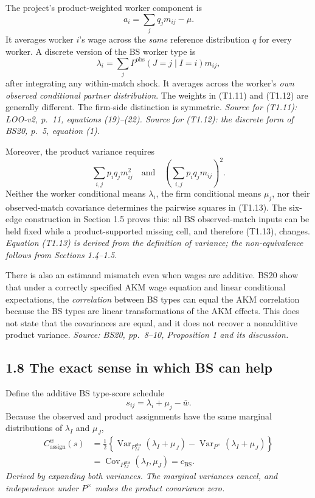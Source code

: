 \documentclass[11pt]{article}
\begin{document}
The project's product-weighted worker component is
\[
a_i
=\sum_jq_jm_{ij}-\mu.
\tag{T1.11}
\]
It averages worker \(i\)'s wage across the \emph{same} reference distribution
\(q\) for every worker.  A discrete version of the BS worker type is
\[
\lambda_i
=\sum_jP^{\mathrm{obs}}(J=j\mid I=i)m_{ij},
\tag{T1.12}
\]
after integrating any within-match shock.  It averages across the worker's
\emph{own observed conditional partner distribution}.  The weights in
(T1.11) and (T1.12) are generally different.  The firm-side distinction is
symmetric.
\textit{Source for (T1.11): LOO-v2, p.\ 11, equations (19)--(22).
Source for (T1.12): the discrete form of BS20, p.\ 5, equation (1).}

Moreover, the product variance requires
\[
\sum_{i,j}p_iq_jm_{ij}^2
\quad\text{and}\quad
\left(\sum_{i,j}p_iq_jm_{ij}\right)^2.
\tag{T1.13}
\]
Neither the worker conditional means \(\lambda_i\), the firm conditional means
\(\mu_j\), nor their observed-match covariance determines the pairwise
squares in (T1.13).  The six-edge construction in Section 1.5 proves this:
all BS observed-match inputs can be held fixed while a product-supported
missing cell, and therefore (T1.13), changes.
\textit{Equation (T1.13) is derived from the definition of variance; the
non-equivalence follows from Sections 1.4--1.5.}

There is also an estimand mismatch even when wages are additive.  BS20 show
that under a correctly specified AKM wage equation and linear conditional
expectations, the \emph{correlation} between BS types can equal the AKM
correlation because the BS types are linear transformations of the AKM
effects.  This does not state that the covariances are equal, and it does not
recover a nonadditive product variance.
\textit{Source: BS20, pp.\ 8--10, Proposition 1 and its discussion.}

\subsection{1.8 The exact sense in which BS can help}

Define the additive BS type-score schedule
\[
s_{ij}=\lambda_i+\mu_j-\bar w.
\tag{T1.14}
\]
Because the observed and product assignments have the same marginal
distributions of \(\lambda_I\) and \(\mu_J\),
\[
\begin{aligned}
C^w_{\mathrm{assign}}(s)
&=\frac12\left\{
\operatorname{Var}_{P^{\mathrm{obs}}_{IJ}}(\lambda_I+\mu_J)
-\operatorname{Var}_{P^\times}(\lambda_I+\mu_J)
\right\}\\
&=\operatorname{Cov}_{P^{\mathrm{obs}}_{IJ}}
(\lambda_I,\mu_J)
=c_{\mathrm{BS}}.
\end{aligned}
\tag{T1.15}
\]
\textit{Derived by expanding both variances.  The marginal variances cancel,
and independence under \(P^\times\) makes the product covariance zero.}
\end{document}
